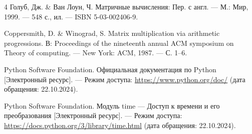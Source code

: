\documentclass[a4paper, 12pt]{extreport}
\begin{document}
\renewcommand{\bibname}{СПИСОК ИСПОЛЬЗОВАННЫХ ИСТОЧНИКОВ}
\begin{thebibliography}{4}
    Голуб, Дж. \& Ван Лоун, Ч. Матричные вычисления: Пер. с англ. — М.: Мир, 1999. — 548 с., ил. — ISBN 5-03-002406-9.

    Coppersmith, D. \& Winograd, S. Matrix multiplication via arithmetic progressions. В: Proceedings of the nineteenth annual ACM symposium on Theory of computing. — New York: ACM, 1987. — С. 1–6.

    Python Software Foundation. Официальная документация по Python [Электронный ресурс]. — Режим доступа: \url{https://www.python.org/doc/} (дата обращения: 22.10.2024).

    Python Software Foundation. Модуль time — Доступ к времени и его преобразования [Электронный ресурс]. — Режим доступа: \url{https://docs.python.org/3/library/time.html} (дата обращения: 22.10.2024).
\end{thebibliography}


\end{document}
